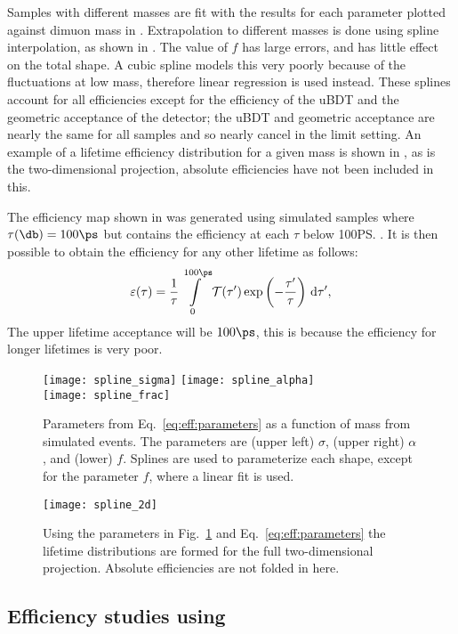 Samples with different masses are fit with the results for each parameter plotted against dimuon
mass in .
Extrapolation to different masses is done using spline interpolation, as shown in
.
The value of $f$ has large errors, and has little effect on the total shape.
A cubic spline models this very poorly because of the fluctuations at low mass, therefore linear
regression is used instead.
These splines account for all efficiencies except for the efficiency of the uBDT and the geometric
acceptance of the \lhcb detector; the uBDT and geometric acceptance are nearly the same for all
samples and so nearly cancel in the limit setting.
An example of a lifetime efficiency distribution for a given mass is shown in ,
as is the two-dimensional projection, absolute efficiencies have not been included in this.

The efficiency map shown in  was generated using simulated samples where
$\tau(\db)=100\ps$ but contains the efficiency at each $\tau$ below 100\ps.
It is then possible to obtain the efficiency for any other lifetime as follows:
\begin{equation}
  \varepsilon(\tau) =
  \frac{1}{\tau}\int\limits_0^{100\ps}
  \mathcal{T}(\tau^{\prime})
  \exp\left(-\frac{\tau^{\prime}}{\tau}\right)
  \,{\rm d}\tau^{\prime},
\end{equation}
The upper lifetime acceptance will be $100\ps$, this is because the efficiency for longer lifetimes
is very poor.


\begin{figure}
  \begin{center}
    \texttt{[image: spline\_sigma]}
    \texttt{[image: spline\_alpha]}\\
    \texttt{[image: spline\_frac]}
    \caption{
      Parameters from Eq.~\protect\ref{eq:eff:parameters} as a function of mass from
      simulated events.
      The parameters are
      (upper left) $\sigma$,
      (upper right) $\alpha$, and
      (lower) $f$.
      Splines are used to parameterize each shape, except for the parameter $f$, where a
      linear fit is used.
    }
    \label{fig:eff:spline}
  \end{center}
\end{figure}

\begin{figure}
  \begin{center}
    \texttt{[image: spline\_2d]}
    \caption{
      Using the parameters in Fig.~\ref{fig:eff:spline} and Eq.~\protect\ref{eq:eff:parameters} the
      lifetime distributions are formed for the full two-dimensional projection.
      Absolute efficiencies are not folded in here.
    }
    \label{fig:eff:effmap}
  \end{center}
\end{figure}



\subsection{Efficiency studies using \decay{\Bd}{\jpsi\Kstarz}}










